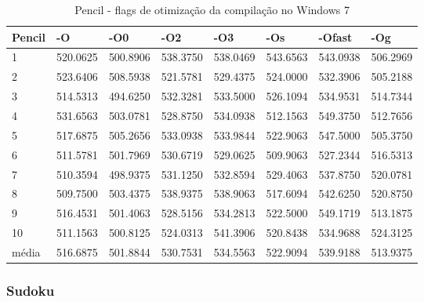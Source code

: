 \begin{table}[!ht]
\centering
\caption{Pencil - flags de otimização da compilação no Windows 7}
\label{tab:otimizacao_compilacao:windows:pencil}
\begin{tabular}{llllllll}
\textbf{Pencil}    & \textbf{-O}  & \textbf{-O0}   & \textbf{-O2} & \textbf{-O3} & \textbf{-Os} & \textbf{-Ofast} & \textbf{-Og} \\ \toprule
1                  & 520.0625     &   500.8906     &    538.3750  &    538.0469  &    543.6563  &   543.0938      &   506.2969       \\ 
2                  & 523.6406     &   508.5938     &    521.5781  &    529.4375  &    524.0000  &   532.3906      &   505.2188       \\ 
3                  & 514.5313     &   494.6250     &    532.3281  &    533.5000  &    526.1094  &   534.9531      &   514.7344       \\ 
4                  & 531.6563     &   503.0781     &    528.8750  &    534.0938  &    512.1563  &   549.3750      &   512.7656       \\ 
5                  & 517.6875     &   505.2656     &    533.0938  &    533.9844  &    522.9063  &   547.5000      &   505.3750       \\ 
6                  & 511.5781     &   501.7969     &    530.6719  &    529.0625  &    509.9063  &   527.2344      &   516.5313       \\ 
7                  & 510.3594     &   498.9375     &    531.1250  &    532.8594  &    529.4063  &   537.8750      &   520.0781       \\ 
8                  & 509.7500     &   503.4375     &    538.9375  &    538.9063  &    517.6094  &   542.6250      &   520.8750       \\ 
9                  & 516.4531     &   501.4063     &    528.5156  &    534.2813  &    522.5000  &   549.1719      &   513.1875       \\ 
10                 & 511.1563     &   500.8125     &    524.0313  &    541.3906  &    520.8438  &   534.9688      &   524.3125       \\ \bottomrule
média              & 516.6875     &   501.8844     &    530.7531  &    534.5563  &    522.9094  &   539.9188      &   513.9375       \\ 
\end{tabular}
\end{table}


\clearpage
\subsubsection*{Sudoku}

